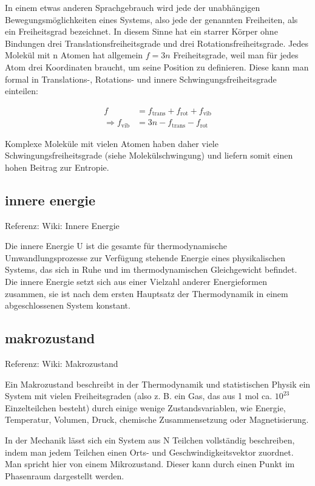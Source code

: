 \documentclass[]{article}
\begin{document}
In einem etwas anderen Sprachgebrauch wird jede der unabhängigen Bewegungsmöglichkeiten eines Systems, also jede der genannten Freiheiten, als ein Freiheitsgrad bezeichnet. In diesem Sinne hat ein starrer Körper ohne Bindungen drei Translationsfreiheitsgrade und drei Rotationsfreiheitsgrade.
Jedes Molekül mit n Atomen hat allgemein $f = 3n$ Freiheitsgrade, weil man für jedes Atom drei Koordinaten braucht, um seine Position zu definieren. Diese kann man formal in Translations-, Rotations- und innere Schwingungsfreiheitsgrade einteilen:

\begin{align} f & = f_\mathrm{trans} + f_\mathrm{rot} + f_\mathrm{vib}\\ 
\Rightarrow f_\mathrm{vib} & = 3n - f_\mathrm{trans} - f_\mathrm{rot} 
\end{align}

Komplexe Moleküle mit vielen Atomen haben daher viele Schwingungsfreiheitsgrade (siehe Molekülschwingung) und liefern somit einen hohen Beitrag zur Entropie.

\subsection{innere energie}
Referenz: Wiki: Innere Energie

Die innere Energie U ist die gesamte für thermodynamische Umwandlungsprozesse zur Verfügung stehende Energie eines physikalischen Systems, das sich in Ruhe und im thermodynamischen Gleichgewicht befindet. Die innere Energie setzt sich aus einer Vielzahl anderer Energieformen zusammen, sie ist nach dem ersten Hauptsatz der Thermodynamik in einem abgeschlossenen System konstant.

\subsection{makrozustand}
Referenz: Wiki: Makrozustand

Ein Makrozustand beschreibt in der Thermodynamik und statistischen Physik ein System mit vielen Freiheitsgraden (also z. B. ein Gas, das aus 1 mol ca. $10^{23}$ Einzelteilchen besteht) durch einige wenige Zustandsvariablen, wie Energie, Temperatur, Volumen, Druck, chemische Zusammensetzung oder Magnetisierung.

In der Mechanik lässt sich ein System aus N Teilchen vollständig beschreiben, indem man jedem Teilchen einen Orts- und Geschwindigkeitsvektor zuordnet. Man spricht hier von einem Mikrozustand. Dieser kann durch einen Punkt im Phasenraum dargestellt werden.
\end{document}
